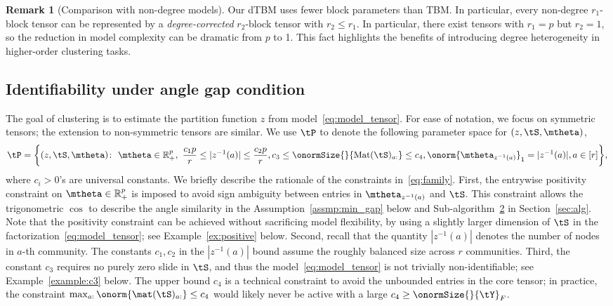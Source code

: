 \documentclass[lettersize,onecolumn,journal]{IEEEtran}
\theoremstyle{definition}
\theoremstyle{definition}
\newtheorem{rmk}{Remark}
\begin{document}
\begin{rmk}[Comparison with non-degree models]
Our dTBM uses fewer block parameters than TBM. In particular, every non-degree $r_1$-block tensor can be represented by a \emph{degree-corrected} $r_2$-block tensor with $r_2\leq r_1$. In particular, there exist tensors with $r_1=p$ but $r_2=1$, so the reduction in model complexity can be dramatic from $p$ to 1. This fact highlights the benefits of introducing degree heterogeneity in higher-order clustering tasks.
\end{rmk}


\subsection{Identifiability under angle gap condition}\label{subsec:identify}
The goal of clustering is to estimate the partition function $z$ from model~\eqref{eq:model_tensor}. For ease of notation, we focus on symmetric tensors; the extension to non-symmetric tensors are similar. We use $\tP$ to denote the following parameter space for $(z,\tS,\mtheta)$,
\begin{align}\label{eq:family}
\tP=\bigg\{(z,\tS,\mtheta)\colon  \ \mtheta\in\mathbb{R}^p_{+},\ 
{c_1p\over r}\leq |z^{-1}(a)|\leq {c_2 p\over r}, c_3\leq \onormSize{}{\text{Mat}(\tS)_{a:}}\leq c_4, \onorm{\mtheta_{z^{-1}(a)}}_1=|z^{-1}(a)|, a\in[r]\bigg\},
\end{align}
\normalsize
where $c_i>0$'s are universal constants. We briefly describe the rationale of the constraints in~\eqref{eq:family}. 
First, the entrywise positivity constraint on  $\mtheta\in\mathbb{R}^p_{+}$ is imposed to avoid sign ambiguity between entries in $\mtheta_{z^{-1}(a)}$ and $\tS$. This constraint allows the trigonometric $\cos$ to describe the angle similarity in the Assumption~\ref{assmp:min_gap} below and Sub-algorithm~\hyperref[alg:main]{2} in Section~\ref{sec:alg}. Note that the positivity constraint can be achieved without sacrificing model flexibility, by using a slightly larger dimension of $\tS$ in the factorization~\eqref{eq:model_tensor}; see Example~\ref{ex:positive} below. Second, recall that the quantity $|z^{-1}(a)|$ denotes the number of nodes in $a$-th community. The constants $c_1, c_2$ in the $|z^{-1}(a)|$ bound assume the roughly balanced size across $r$ communities.   { Third, the constant $c_3$ requires no purely zero slide in $\tS$, and thus the model~\eqref{eq:model_tensor} is not trivially non-identifiable; see Example~\ref{example:c3} below. The upper bound $c_4$ is a technical constraint to avoid the unbounded entries in the core tensor; in practice, the constraint $\max_{a:} \onorm{\mat(\tS)_{a:}} \leq c_4$ would likely never be active with a large $c_4 \geq \onormSize{}{\tY}_F$. }  
\end{document}
